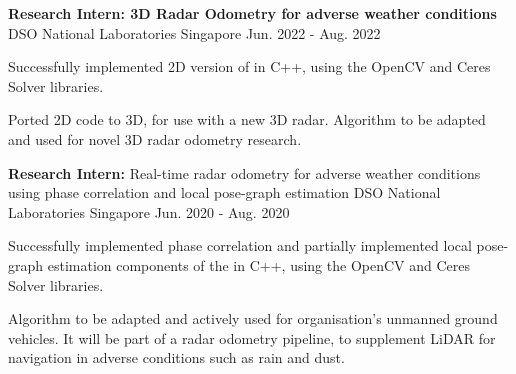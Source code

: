 


\begin{cventries}


\label{radarSLAM}

\cventry
{
    \textbf{Research Intern: 3D Radar Odometry for adverse weather conditions} 
} %
{DSO National Laboratories} %
{Singapore} %
{Jun. 2022 - Aug. 2022} %
{ %
    \begin{cvitems}
        \item { Successfully implemented 2D version of  in C++, using the OpenCV and Ceres Solver libraries.}
        \item { Ported 2D code to 3D, for use with a new 3D radar. Algorithm to be adapted and used for novel 3D radar odometry research. }
    \end{cvitems}
}



\label{radarOdometry}

\cventry
{
	\textbf{Research Intern:} Real-time radar odometry for adverse weather conditions using phase correlation and local pose-graph estimation
} %
{DSO National Laboratories} %
{Singapore} %
{Jun. 2020 - Aug. 2020} %
{ %
	\begin{cvitems}
		\item { Successfully implemented phase correlation and partially implemented local pose-graph estimation components of the  in C++, using the OpenCV and Ceres Solver libraries.}
		\item { Algorithm to be adapted and actively used for organisation's unmanned ground vehicles. It will be part of a radar odometry pipeline, to supplement LiDAR for navigation in adverse conditions such as rain and dust. }
	\end{cvitems}
}


\end{cventries}

